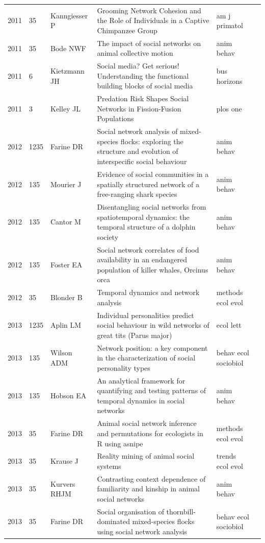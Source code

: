 \documentclass[11pt]{article} %
\begin{document}
\begin{landscape}
\begin{longtable}{p{0.7cm}|p{0.8cm}|p{3cm}|p{14.5cm}|p{3.5cm}l}
2011& 	35& 	 Kanngiesser P& 	 Grooming Network Cohesion and the Role of Individuals in a Captive Chimpanzee Group& 	 am j primatol\\
2011& 	35& 	 Bode NWF& 	 The impact of social networks on animal collective motion& 	 anim behav\\
2011& 	6& 	 Kietzmann JH& 	 Social media? Get serious! Understanding the functional building blocks of social media& 	 bus horizons\\
2011& 	3& 	 Kelley JL& 	 Predation Risk Shapes Social Networks in Fission-Fusion Populations& 	 plos one\\
2012& 	1235& 	 Farine DR& 	 Social network analysis of mixed-species flocks: exploring the structure and evolution of interspecific social behaviour& 	 anim behav\\
2012& 	135& 	 Mourier J& 	 Evidence of social communities in a spatially structured network of a free-ranging shark species& 	 anim behav\\
2012& 	135& 	 Cantor M& 	 Disentangling social networks from spatiotemporal dynamics: the temporal structure of a dolphin society& 	 anim behav\\
2012& 	135& 	 Foster EA& 	 Social network correlates of food availability in an endangered population of killer whales, Orcinus orca& 	 anim behav\\
2012& 	35& 	 Blonder B& 	 Temporal dynamics and network analysis& 	 methods ecol evol\\
2013& 	1235& 	 Aplin LM& 	 Individual personalities predict social behaviour in wild networks of great tits (Parus major)& 	 ecol lett\\
2013& 	135& 	 Wilson ADM& 	 Network position: a key component in the characterization of social personality types& 	 behav ecol sociobiol\\
2013& 	135& 	 Hobson EA& 	 An analytical framework for quantifying and testing patterns of temporal dynamics in social networks& 	 anim behav\\
2013& 	35& 	 Farine DR& 	 Animal social network inference and permutations for ecologists in R using asnipe& 	 methods ecol evol\\
2013& 	35& 	 Krause J& 	 Reality mining of animal social systems& 	 trends ecol evol\\
2013& 	35& 	 Kurvers RHJM& 	 Contrasting context dependence of familiarity and kinship in animal social networks& 	 anim behav\\
2013& 	35& 	 Farine DR& 	 Social organisation of thornbill-dominated mixed-species flocks using social network analysis& 	 behav ecol sociobiol\\

\end{longtable}
\end{landscape}
\end{document}
